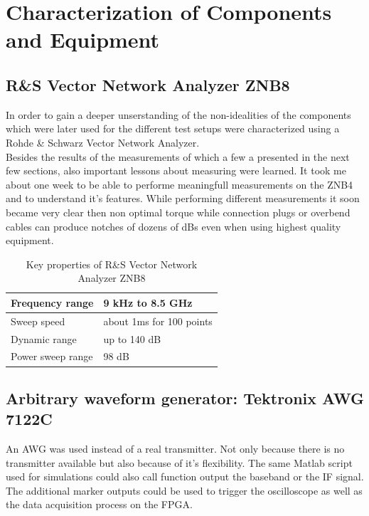 \chapter{Characterization of Components and Equipment}

\section{R\&S Vector Network Analyzer ZNB8}
In order to gain a deeper unserstanding of the non-idealities of the
components which were later used for the different test setups
were characterized using a Rohde \& Schwarz Vector Network Analyzer. \\

Besides the results of the measurements of which a few a presented
in the next few sections, also important lessons about measuring were
learned. It took me about one week to be able to performe meaningfull
measurements on the ZNB4 and to understand it's features.
While performing different measurements it soon became very clear then
non optimal torque while connection plugs or overbend cables
can produce notches of dozens of dBs even when using highest quality
equipment. \\

\begin{table}[h]
  \centering
  \begin{tabular}{|l|l|}
    \hline
    Frequency range & 9 kHz to 8.5 GHz \\ \hline
    Sweep speed & about 1ms for 100 points \\ \hline
    Dynamic range & up to 140 dB \\ \hline
    Power sweep range & 98 dB \\ \hline
  \end{tabular}
  \caption{Key properties of R\&S Vector Network Analyzer ZNB8}
  \label{tab:awg}
\end{table}

\section{Arbitrary waveform generator: Tektronix AWG 7122C}
\label{sec:comp_awg}

An \acrfull{AWG} was used instead of a real transmitter.
Not only because there is no transmitter available but also because of
it's flexibility. The same Matlab script used for simulations could
also call function output the baseband or the \gls{IF} signal.
The additional marker outputs could be used to trigger the oscilloscope
as well as the data acquisition process on the \gls{FPGA}.

